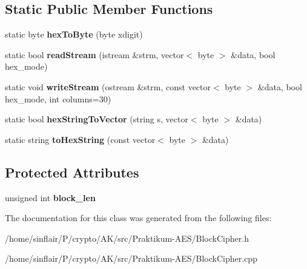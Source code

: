 \subsection*{Static Public Member Functions}
\begin{DoxyCompactItemize}
\item 
\mbox{\label{classBlockCipher_ae55a65434bf1d4b59375916a0e58664c}} 
static byte {\bfseries hex\+To\+Byte} (byte xdigit)
\item 
\mbox{\label{classBlockCipher_a6c951af389b9ddb9f40c410d18ab5c66}} 
static bool {\bfseries read\+Stream} (istream \&strm, vector$<$ byte $>$ \&data, bool hex\+\_\+mode)
\item 
\mbox{\label{classBlockCipher_a3839442ae65dd2a710a015b53e9117bf}} 
static void {\bfseries write\+Stream} (ostream \&strm, const vector$<$ byte $>$ \&data, bool hex\+\_\+mode, int columns=30)
\item 
\mbox{\label{classBlockCipher_a58dfa6f0548071b3988c8c8990e54c93}} 
static bool {\bfseries hex\+String\+To\+Vector} (string s, vector$<$ byte $>$ \&data)
\item 
\mbox{\label{classBlockCipher_ad000d34ae66e52ee8484a651793d7dfa}} 
static string {\bfseries to\+Hex\+String} (const vector$<$ byte $>$ \&data)
\end{DoxyCompactItemize}
\subsection*{Protected Attributes}
\begin{DoxyCompactItemize}
\item 
\mbox{\label{classBlockCipher_ab29ee03262fd620cd0659e860972faf0}} 
unsigned int {\bfseries block\+\_\+len}
\end{DoxyCompactItemize}


The documentation for this class was generated from the following files\+:\begin{DoxyCompactItemize}
\item 
/home/sinflair/\+P/crypto/\+A\+K/src/\+Praktikum-\/\+A\+E\+S/Block\+Cipher.\+h\item 
/home/sinflair/\+P/crypto/\+A\+K/src/\+Praktikum-\/\+A\+E\+S/Block\+Cipher.\+cpp\end{DoxyCompactItemize}
